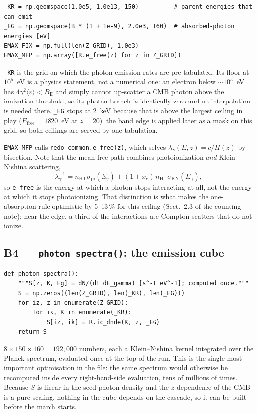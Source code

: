 \documentclass[11pt,a4paper]{article}
\newcommand{\code}[1]{\texttt{\small #1}}
\newcommand{\eps}{\varepsilon}
\newcommand{\Eg}{E_\gamma}
\newcommand{\BH}{B_{\mathrm{H}}}
\newcommand{\nHI}{n_{\mathrm{H\,I}}}
\newcommand{\spi}{\sigma_{\mathrm{pi}}}
\begin{document}
\begin{lstlisting}
_KR = np.geomspace(1.0e5, 1.0e13, 150)          # parent energies that can emit
_EG = np.geomspace(B * (1 + 1e-9), 2.0e3, 160)  # absorbed-photon energies [eV]
EMAX_FIX = np.full(len(Z_GRID), 1.0e3)
EMAX_MFP = np.array([R.e_free(z) for z in Z_GRID])
\end{lstlisting}

\code{\_KR} is the grid on which the photon emission rates are pre-tabulated.
Its floor at $10^5$~eV is a physics statement, not a numerical one: an electron
below $\sim10^5$~eV has $4\gamma^2\langle\eps\rangle < \BH$ and simply cannot
up-scatter a CMB photon above the ionization threshold, so its photon branch is
identically zero and no interpolation is needed there.  \code{\_EG} stops at
2~keV because that is above the largest ceiling in play
($E_{\mathrm{free}}=1820$~eV at $z=20$); the band edge is applied later as a
mask on this grid, so both ceilings are served by one tabulation.

\code{EMAX\_MFP} calls \code{redo\_common.e\_free(z)}, which solves
$\lambda_\gamma(E,z) = c/H(z)$ by bisection.  Note that the mean free path
combines photoionization \emph{and} Klein--Nishina scattering,
\[
  \lambda_\gamma^{-1} = \nHI\,\spi(\Eg) + (1+x_e)\,\nHI\,\sigma_{\mathrm{KN}}(\Eg),
\]
so \code{e\_free} is the energy at which a photon stops interacting at all,
not the energy at which it stops photoionizing.  That distinction is what
makes the one-absorption rule optimistic by 5--13\,\% for this ceiling
(Sect.~2.3 of the counting note): near the edge, a third of the interactions
are Compton scatters that do not ionize.

\subsection*{B4 --- \code{photon\_spectra()}: the emission cube}

\begin{lstlisting}
def photon_spectra():
    """S[z, K, Eg] = dN/(dt dE_gamma) [s^-1 eV^-1]; computed once."""
    S = np.zeros((len(Z_GRID), len(_KR), len(_EG)))
    for iz, z in enumerate(Z_GRID):
        for ik, K in enumerate(_KR):
            S[iz, ik] = R.ic_dnde(K, z, _EG)
    return S
\end{lstlisting}

$8\times150\times160 = 192{,}000$ numbers, each a Klein--Nishina kernel
integrated over the Planck spectrum, evaluated once at the top of the run.
This is the single most important optimisation in the file: the same spectrum
would otherwise be recomputed inside every right-hand-side evaluation, tens of
millions of times.  Because $S$ is linear in the seed photon density and the
$z$-dependence of the CMB is a pure scaling, nothing in the cube depends on the
cascade, so it can be built before the march starts.
\end{document}
